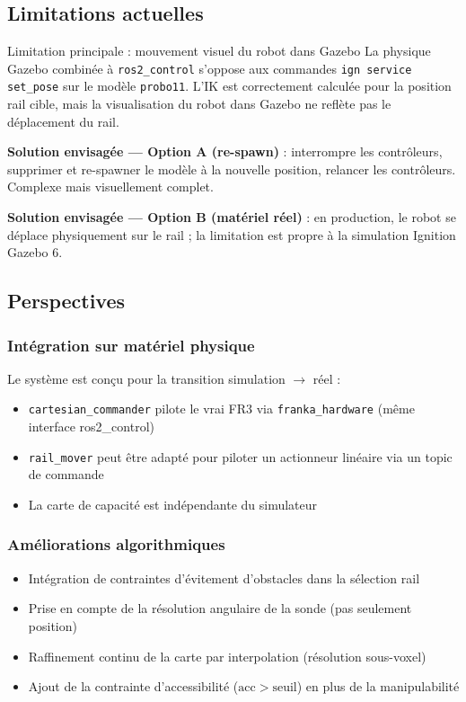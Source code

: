 \documentclass[11pt, a4paper]{article}
\begin{document}
\subsection{Limitations actuelles}

\begin{warnbox}{Limitation principale : mouvement visuel du robot dans Gazebo}
La physique Gazebo combinée à \texttt{ros2\_control} s'oppose aux commandes \texttt{ign service set\_pose} sur le modèle \texttt{probo11}. L'IK est correctement calculée pour la position rail cible, mais la visualisation du robot dans Gazebo ne reflète pas le déplacement du rail.

\textbf{Solution envisagée — Option A (re-spawn)} : interrompre les contrôleurs, supprimer et re-spawner le modèle à la nouvelle position, relancer les contrôleurs. Complexe mais visuellement complet.

\textbf{Solution envisagée — Option B (matériel réel)} : en production, le robot se déplace physiquement sur le rail ; la limitation est propre à la simulation Ignition Gazebo 6.
\end{warnbox}

\subsection{Perspectives}

\subsubsection{Intégration sur matériel physique}

Le système est conçu pour la transition simulation $\to$ réel :
\begin{itemize}[leftmargin=1.5em, itemsep=2pt]
  \item \texttt{cartesian\_commander} pilote le vrai FR3 via \texttt{franka\_hardware} (même interface ros2\_control)
  \item \texttt{rail\_mover} peut être adapté pour piloter un actionneur linéaire via un topic de commande
  \item La carte de capacité est indépendante du simulateur
\end{itemize}

\subsubsection{Améliorations algorithmiques}

\begin{itemize}[leftmargin=1.5em, itemsep=2pt]
  \item Intégration de contraintes d'évitement d'obstacles dans la sélection rail
  \item Prise en compte de la résolution angulaire de la sonde (pas seulement position)
  \item Raffinement continu de la carte par interpolation (résolution sous-voxel)
  \item Ajout de la contrainte d'accessibilité ($\mathrm{acc} > \text{seuil}$) en plus de la manipulabilité
\end{itemize}
\end{document}
